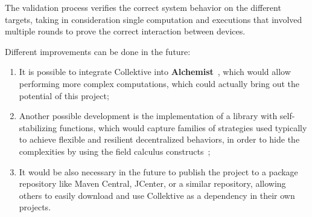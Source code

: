 The validation process verifies the correct system behavior on the different targets, taking in consideration single computation and executions that involved multiple rounds to prove the correct interaction between devices.

Different improvements can be done in the future:
\begin{enumerate}
    \item It is possible to integrate Collektive into \textbf{Alchemist}~\cite{alchemist}, which would allow performing more complex computations, which could actually bring out the potential of this project;
    \item Another possible development is the implementation of a library with self-stabilizing functions, which would capture families of strategies used typically to achieve flexible and resilient decentralized behaviors, in order to hide the complexities by using the field calculus constructs~\cite{self_stabilisation_functions};
    \item It would be also necessary in the future to publish the project  to a package repository like Maven Central, JCenter, or a similar repository, allowing others to easily download and use Collektive as a dependency in their own projects.
\end{enumerate}